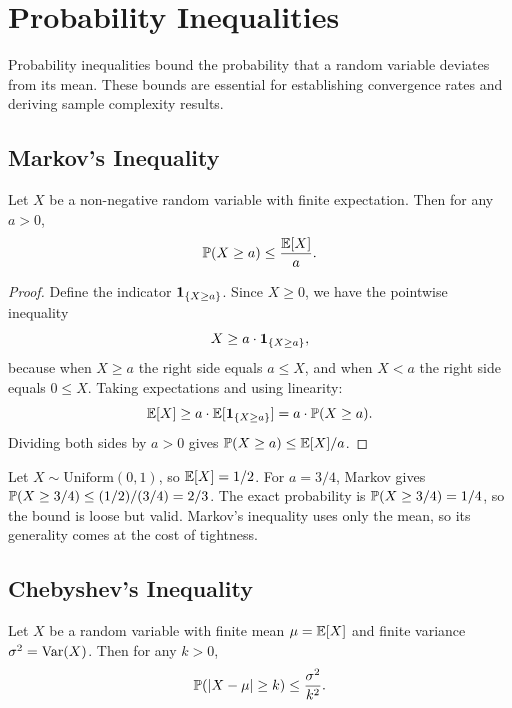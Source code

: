 \documentclass[11pt,a4paper]{article}
\begin{document}
\section{Probability Inequalities}
\label{sec:inequalities}

Probability inequalities bound the probability that a random variable
deviates from its mean. These bounds are essential for establishing
convergence rates and deriving sample complexity results.

\subsection{Markov's Inequality}

\begin{theorem}
\label{thm:markov}
Let $X$ be a non-negative random variable with finite expectation.
Then for any $a > 0$,
\[
    \mathbb{P}(X \geq a) \leq \frac{\mathbb{E}[X]}{a}.
\]
\end{theorem}

\begin{proof}
Define the indicator $\mathbf{1}_{\{X \geq a\}}$. Since $X \geq 0$,
we have the pointwise inequality
\[
    X \geq a \cdot \mathbf{1}_{\{X \geq a\}},
\]
because when $X \geq a$ the right side equals $a \leq X$, and when
$X < a$ the right side equals $0 \leq X$. Taking expectations and
using linearity:
\[
    \mathbb{E}[X] \geq a \cdot \mathbb{E}[\mathbf{1}_{\{X \geq a\}}]
    = a \cdot \mathbb{P}(X \geq a).
\]
Dividing both sides by $a > 0$ gives
$\mathbb{P}(X \geq a) \leq \mathbb{E}[X]/a$.
\end{proof}

\begin{example}
\label{ex:markov_uniform}
Let $X \sim \mathrm{Uniform}(0, 1)$, so $\mathbb{E}[X] = 1/2$. For
$a = 3/4$, Markov gives
$\mathbb{P}(X \geq 3/4) \leq (1/2)/(3/4) = 2/3$.
The exact probability is $\mathbb{P}(X \geq 3/4) = 1/4$, so the bound
is loose but valid. Markov's inequality uses only the mean, so its
generality comes at the cost of tightness.
\end{example}

\subsection{Chebyshev's Inequality}

\begin{theorem}
\label{thm:chebyshev}
Let $X$ be a random variable with finite mean $\mu = \mathbb{E}[X]$ and
finite variance $\sigma^2 = \operatorname{Var}(X)$. Then for any $k > 0$,
\[
    \mathbb{P}(|X - \mu| \geq k) \leq \frac{\sigma^2}{k^2}.
\]
\end{theorem}
\end{document}
